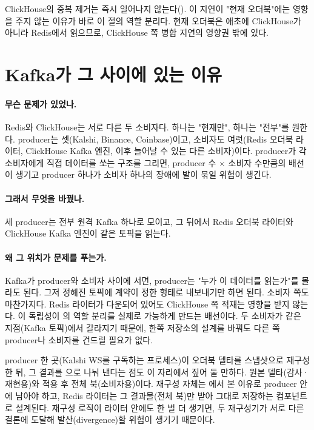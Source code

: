 \begin{callout}
ClickHouse의 중복 제거는 즉시 일어나지 않는다(). 이 지연이
"현재 오더북"에는 영향을 주지 않는 이유가 바로 이 절의 역할 분리다. 현재 오더북은
애초에 ClickHouse가 아니라 Redis에서 읽으므로, ClickHouse 쪽 병합 지연의 영향권 밖에
있다.
\end{callout}

\section{Kafka가 그 사이에 있는 이유}
\label{sec:arch-kafka}

\paragraph{무슨 문제가 있었나.} Redis와 ClickHouse는 서로 다른 두 소비자다. 하나는
"현재만", 하나는 "전부"를 원한다. producer는 셋(Kalshi, Binance, Coinbase)이고,
소비자도 여럿(Redis 오더북 라이터, ClickHouse Kafka 엔진, 이후 늘어날 수 있는 다른
소비자)이다. producer가 각 소비자에게 직접 데이터를 쏘는 구조를 그리면, producer
수 $\times$ 소비자 수만큼의 배선이 생기고 producer 하나가 소비자 하나의 장애에
발이 묶일 위험이 생긴다.

\paragraph{그래서 무엇을 바꿨나.} 세 producer는 전부 원격 Kafka 하나로 모이고, 그
뒤에서 Redis 오더북 라이터와 ClickHouse Kafka 엔진이  같은
토픽을 읽는다.

\paragraph{왜 그 위치가 문제를 푸는가.} Kafka가 producer와 소비자 사이에 서면,
producer는 "누가 이 데이터를 읽는가"를 몰라도 된다. 그저 정해진 토픽에 계약이 정한
형태로 내보내기만 하면 된다. 소비자 쪽도 마찬가지다. Redis 라이터가 다운되어 있어도
ClickHouse 쪽 적재는 영향을 받지 않는다. 이 독립성이 의
역할 분리를 실제로 가능하게 만드는 배선이다. 두 소비자가 같은 지점(Kafka 토픽)에서
갈라지기 때문에, 한쪽 저장소의 설계를 바꿔도 다른 쪽 producer나 소비자를 건드릴
필요가 없다.

producer 한 곳(Kalshi WS를 구독하는 프로세스)이 오더북 델타를 스냅샷으로 재구성한
뒤, 그 결과를 으로 나눠 낸다는 점도 이 자리에서 짚어 둘 만하다. 원본 델타(감사·재현용)와 적용 후 전체 북(소비자용)이다. 재구성 자체는
에서 본 이유로 producer 안에 남아야 하고, Redis 라이터는
그 결과물(전체 북)만 받아 그대로 저장하는  컴포넌트로
설계된다. 재구성 로직이 라이터 안에도 한 벌 더 생기면, 두 재구성기가 서로 다른
결론에 도달해 발산(divergence)할 위험이 생기기 때문이다.


